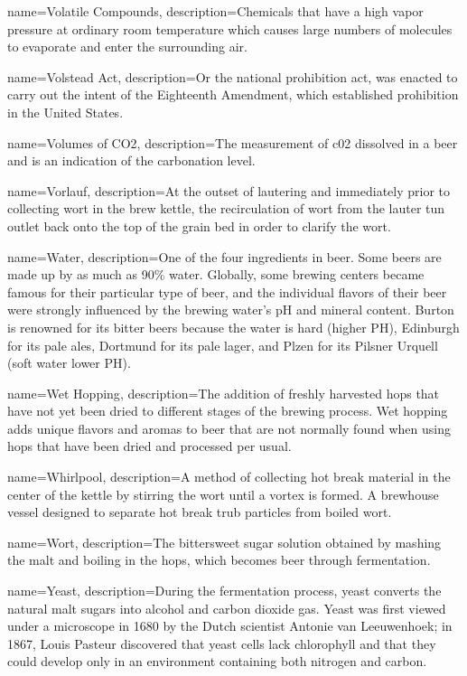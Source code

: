 {
  name={Volatile Compounds},
  description={Chemicals that have a high vapor pressure at ordinary room temperature which causes large numbers of molecules to evaporate and enter the surrounding air.}
  }

{
  name={Volstead Act},
  description={Or the national prohibition act, was enacted to carry out the intent of the Eighteenth Amendment, which established prohibition in the United States.}
  }

{
  name={Volumes of CO2},
  description={The measurement of c02 dissolved in a beer and is an indication of the carbonation level.}
  }

{
  name={Vorlauf},
  description={At the outset of lautering and immediately prior to collecting wort in the brew kettle, the recirculation of wort from the lauter tun outlet back onto the top of the grain bed in order to clarify the wort.}
  }

{
  name={Water},
  description={One of the four ingredients in beer. Some beers are made up by as much as 90\% water. Globally, some brewing centers became famous for their particular type of beer, and the individual flavors of their beer were strongly influenced by the brewing water’s pH and mineral content. Burton is renowned for its bitter beers because the water is hard (higher PH), Edinburgh for its pale ales, Dortmund for its pale lager, and Plzen for its Pilsner Urquell (soft water lower PH).}
  }

{
  name={Wet Hopping},
  description={The addition of freshly harvested hops that have not yet been dried to different stages of the brewing process. Wet hopping adds unique flavors and aromas to beer that are not normally found when using hops that have been dried and processed per usual.}
  }

{
  name={Whirlpool},
  description={A method of collecting hot break material in the center of the kettle by stirring the wort until a vortex is formed.  A brewhouse vessel designed to separate hot break trub particles from boiled wort.}
  }

{
  name={Wort},
  description={The bittersweet sugar solution obtained by mashing the malt and boiling in the hops, which becomes beer through fermentation.}
  }

{
  name={Yeast},
  description={During the fermentation process, yeast converts the natural malt sugars into alcohol and carbon dioxide gas. Yeast was first viewed under a microscope in 1680 by the Dutch scientist Antonie van Leeuwenhoek; in 1867, Louis Pasteur discovered that yeast cells lack chlorophyll and that they could develop only in an environment containing both nitrogen and carbon.}
  }

